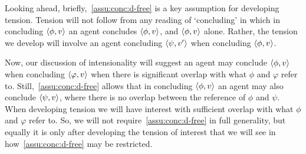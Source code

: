 \begin{note}
  Looking ahead, briefly,~\autoref{assu:conc:d-free} is a key assumption for developing tension.
  Tension will not follow from any reading of `concluding' in which in concluding \(\langle \phi, v \rangle\) an agent concludes \(\langle \phi, v \rangle\), and \(\langle \phi, v \rangle\) alone.
  Rather, the tension we develop will involve an agent concluding \(\langle \psi, v' \rangle\) when concluding \(\langle \phi, v \rangle\).

  Now, our discussion of intensionality will suggest an agent may conclude \(\langle \phi, v \rangle\) when concluding \(\langle \varphi, v \rangle\) when there is significant overlap with what \(\phi\) and \(\varphi\) refer to.
  Still,~\autoref{assu:conc:d-free} allows that in concluding \(\langle \phi, v \rangle\) an agent may also conclude \(\langle \psi, v \rangle\), where there is no overlap between the reference of \(\phi\) and \(\psi\).
  When developing tension we will have interest with sufficient overlap with what \(\phi\) and \(\varphi\) refer to.
  So, we will not require~\autoref{assu:conc:d-free} in full generality, but equally it is only after developing the tension of interest that we will see in how~\autoref{assu:conc:d-free} may be restricted.
\end{note}

